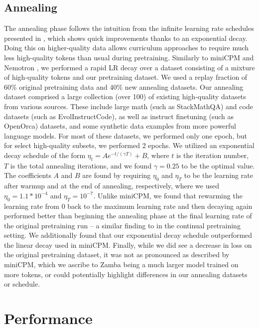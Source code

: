 \subsection{Annealing}
The annealing phase follows the intuition from the infinite learning rate schedules presented in \citet{ibrahim2024simple}, which shows quick improvements thanks to an exponential decay. Doing this on higher-quality data allows curriculum approaches to require much less high-quality tokens than usual during pretraining. Similarly to miniCPM \citep{hu2024minicpm} and Nemotron \citep{parmar2024nemotron}, we performed a rapid LR decay over a dataset consisting of a mixture of high-quality tokens and our pretraining dataset. We used a replay fraction of 60\% original pretraining data and 40\% new annealing datasets. Our annealing dataset comprised a large collection (over 100) of existing high-quality datasets from various sources. These include large math (such as StackMathQA) and code datasets (such as EvolInstructCode), as well as instruct finetuning (such as OpenOrca) datasets, and some synthetic data examples from more powerful language models. For most of these datasets, we performed only one epoch, but for select high-quality subsets, we performed 2 epochs. We utilized an exponential decay schedule of the form $\eta_t = A e^{-t/(\gamma T)}+B$, where $t$ is the iteration number, $T$ is the total annealing iterations, and we found $\gamma=0.25$ to be the optimal value. The coefficients $A$ and $B$ are found by requiring $\eta_0$ and $\eta_T$ to be the learning rate after warmup and at the end of annealing, respectively, where we used $\eta_0=1.1*10^{-4}$ and $\eta_T=10^{-7}$. Unlike miniCPM, we found that rewarming the learning rate from $0$ back to the maximum learning rate and then decaying again performed better than beginning the annealing phase at the final learning rate of the original pretraining run -- a similar finding to \citet{ibrahim2024simple} in the continual pretraining setting. We additionally found that our exponential decay schedule outperformed the linear decay used in miniCPM. Finally, while we did see a decrease in loss on the original pretraining dataset, it was not as pronounced as described by miniCPM, which we ascribe to Zamba being a much larger model trained on more tokens, or could potentially highlight differences in our annealing datasets or schedule.

\renewcommand*{\thefootnote}{\fnsymbol{footnote}}

\section{Performance}

